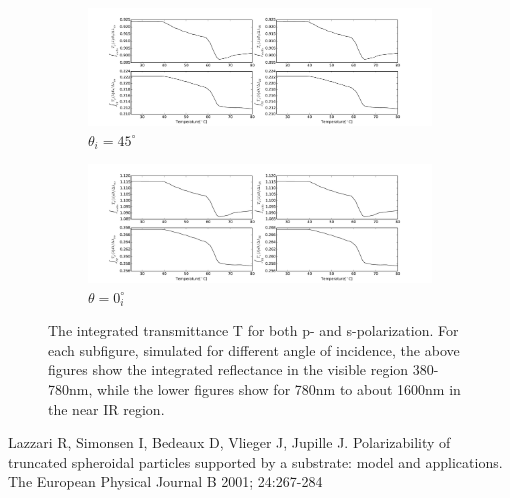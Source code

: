 \begin{figure}[h!]
    \centering
    \begin{subfigure}[b]{\textwidth}
        \centering
        \includegraphics[width=\textwidth, trim={2.5cm 0.3cm 4cm 1.1cm},clip]{Results/Sim3/integratedTransmittance.pdf}
        \caption{$\theta_i = 45^{\circ}$}
        \label{fig:dR10p}
        \vspace*{1cm}
    \end{subfigure}
    \begin{subfigure}[b]{\textwidth}
        \centering
        \includegraphics[width=\textwidth, trim={2.5cm 0.3cm 4cm 1.1cm},clip]{Results/Sim3/integratedTransmittance_theta0.pdf}
        \caption{$\theta = 0_i^{\circ}$}
        \label{fig:dR15s}
    \end{subfigure}
    \caption{
       The integrated transmittance T for both p- and s-polarization. For each subfigure, simulated for
       different angle of incidence, the above figures show the integrated reflectance in the visible
       region 380-780nm, while the lower figures show for 780nm to about 1600nm in the near IR region.
    }
    \label{fig:dR}
\end{figure}
%

\begin{thebibliography}{9}

   Lazzari R, Simonsen I, Bedeaux D, Vlieger J, Jupille J.
   Polarizability of truncated spheroidal particles supported by a substrate: model and applications.
   The European Physical Journal B 2001; 24:267-284
\end{thebibliography}



